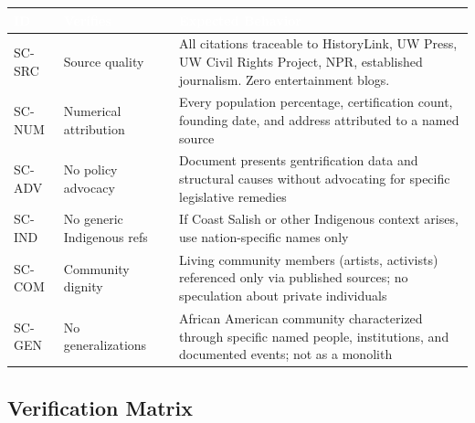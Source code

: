\documentclass[11pt,letterpaper]{article}
\newcommand{\tableheader}[1]{\textbf{\sffamily\textcolor{white}{#1}}}
\begin{document}
\begin{center}
\begin{tabularx}{\textwidth}{L{1.5cm}L{3.5cm}X}
\toprule
{}
\tableheader{ID} & \tableheader{Verifies} & \tableheader{Expected Behavior} \\
\midrule
SC-SRC & Source quality & All citations traceable to HistoryLink, UW Press, UW Civil Rights Project, NPR, established journalism. Zero entertainment blogs. \\
SC-NUM & Numerical attribution & Every population percentage, certification count, founding date, and address attributed to a named source \\
SC-ADV & No policy advocacy & Document presents gentrification data and structural causes without advocating for specific legislative remedies \\
SC-IND & No generic Indigenous refs & If Coast Salish or other Indigenous context arises, use nation-specific names only \\
SC-COM & Community dignity & Living community members (artists, activists) referenced only via published sources; no speculation about private individuals \\
SC-GEN & No generalizations & African American community characterized through specific named people, institutions, and documented events; not as a monolith \\
\bottomrule
\end{tabularx}
\end{center}

\subsection{Verification Matrix}
\end{document}
